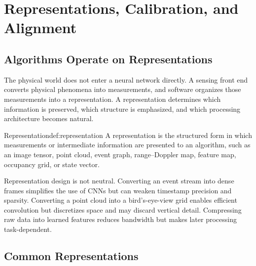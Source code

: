 \chapter{Representations, Calibration, and Alignment}
\label{chap:representation-alignment}

\section{Algorithms Operate on Representations}

The physical world does not enter a neural network directly. A sensing front end converts physical phenomena into measurements, and software organizes those measurements into a representation. A representation determines which information is preserved, which structure is emphasized, and which processing architecture becomes natural.

\begin{definition}{Representation}{def:representation}
A representation is the structured form in which measurements or intermediate information are presented to an algorithm, such as an image tensor, point cloud, event graph, range--Doppler map, feature map, occupancy grid, or state vector.
\end{definition}

Representation design is not neutral. Converting an event stream into dense frames simplifies the use of CNNs but can weaken timestamp precision and sparsity. Converting a point cloud into a bird's-eye-view grid enables efficient convolution but discretizes space and may discard vertical detail. Compressing raw data into learned features reduces bandwidth but makes later processing task-dependent.

\section{Common Representations}

